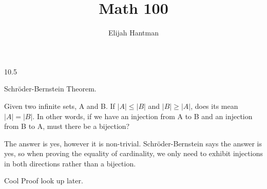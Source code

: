 \documentclass{report}
\title{\Huge{Math 100}}
\author{\huge{Elijah Hantman}}
\date{}
\begin{document}
\maketitle
\newpage

\begin{description}
    \item 10.5
        \begin{mdframed}
            Schr\"oder-Bernstein Theorem. 

            Given two infinite sets, A and B.
            If $|A| \le |B|$ and $|B| \ge |A|$, does
            its mean $|A| = |B|$. In other words,
            if we have an injection from A to B
            and an injection from B to A, must there
            be a bijection?

            The answer is yes, however it is non-trivial. Schr\"oder-Bernstein
            says the answer is yes, so when proving the equality of cardinality,
            we only need to exhibit injections in both directions rather
            than a bijection.


            Cool Proof look up later.
        \end{mdframed}

\end{description}
\end{document}
